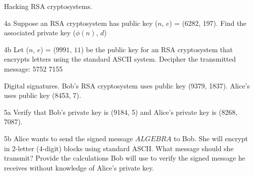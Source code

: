 

\begin{question}{4}
Hacking RSA cryptosystems.
\end{question}


\begin{question}{4a}
Suppose an RSA cryptosystem has public key ($n$, $e$) = (6282, 197). Find the associated private key ($\phi(n)$, $d$)
\end{question}


\begin{question}{4b}
Let ($n$, $e$) = ($9991$, $11$) be the public key for an RSA cryptosystem that encrypts
letters using the standard ASCII system. Decipher the transmitted message: 5752 7155
\end{question}


\begin{question}{5}
Digital signatures. Bob's RSA cryptosystem uses public key (9379, 1837). Alice's uses
public key (8453, 7).
\end{question}


\begin{question}{5a}
Verify that Bob's private key is (9184, 5) and Alice's private key is (8268, 7087).
\end{question}


\begin{question}{5b}
Alice wants to send the signed message $ALGEBRA$ to Bob. She will encrypt in
2-letter (4-digit) blocks using standard ASCII. What message should she transmit? Provide
the calculations Bob will use to verify the signed message he receives without knowledge of
Alice's private key.
\end{question}

